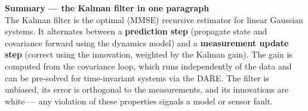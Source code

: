 \documentclass[12pt, a4paper]{article}
\begin{document}
\begin{keybox}
  \textbf{Summary --- the Kalman filter in one paragraph}\\
  The Kalman filter is the optimal (MMSE) recursive estimator for
  linear Gaussian systems.
  It alternates between a \textbf{prediction step} (propagate
  state and covariance forward using the dynamics model) and a
  \textbf{measurement update step} (correct using the innovation,
  weighted by the Kalman gain).
  The gain is computed from the covariance loop, which runs
  independently of the data and can be pre-solved for
  time-invariant systems via the DARE.
  The filter is unbiased, its error is orthogonal to the
  measurements, and its innovations are white --- any violation
  of these properties signals a model or sensor fault.
\end{keybox}
\end{document}
